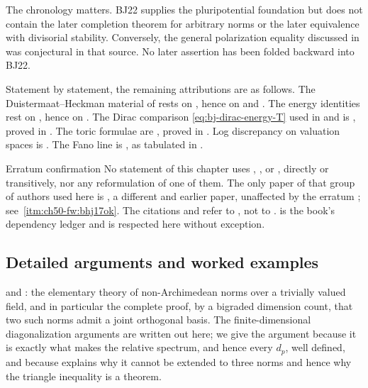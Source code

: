 The chronology matters.  BJ22 supplies the pluripotential foundation but
does not contain the later completion theorem for arbitrary norms or the
later equivalence with divisorial stability.  Conversely, the general
polarization equality discussed in
 was conjectural in that
source.  No later assertion has been folded backward into BJ22.

Statement by statement, the remaining attributions are as follows.  The
Duistermaat--Heckman material of  rests on
, hence on \cite{BC11} and
\cite[\S3]{BHJ17}.  The energy identities rest on
, hence on
\cite[\S\S7--10]{BJ22}.  The Dirac comparison
\eqref{eq:bj-dirac-energy-T} used in
 and  is
\cite[Proposition~11.1]{BJ22}, proved in
.  The toric formulae are
\cite[Appendix~B]{BJ22}, proved in
.  Log discrepancy on
valuation spaces is \cite{JM12}.  The Fano line is
\cite{Li17,Fuj19,BJ20,LXZ22}, as tabulated in
.

\begin{important}{Erratum confirmation}
\label{imp:ch50-erratum-confirmation}
No statement of this chapter uses \cite[Theorem~5.6]{BHJ19},
\cite[Theorem~5.4]{BHJ19}, \cite[Theorem~C]{BHJ19} or
\cite[Corollaries~D--E]{BHJ19}, directly or transitively, nor any
reformulation of one of them.  The only paper of that group of authors used
here is \cite{BHJ17}, a different and earlier paper, unaffected by the
erratum \cite{BHJ19err}; see
\,\cref{itm:ch50-fw:bhj17ok}.  The
citations \cite[Theorem~C]{BJKS1} and \cite[Theorem~A]{BJKS1} refer to
\cite{BJKS1}, not to \cite{BHJ19}.   is the
book's dependency ledger and is respected here without exception.
\end{important}

\subsection{Detailed arguments and worked examples}
\label{sec:ch50-additions}

 and
: the elementary theory of
non-Archimedean norms over a trivially valued field, and in particular the
complete proof, by a bigraded dimension count, that two such norms admit a
joint orthogonal basis.  The finite-dimensional diagonalization arguments are written out here; we
give the argument because it is exactly what makes the relative spectrum,
and hence every $d_p$, well defined, and because
 explains why it cannot be extended to three
norms and hence why the triangle inequality is a theorem.

